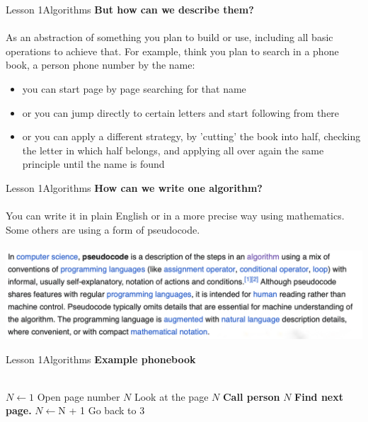 \documentclass[aspectratio=1610]{beamer}
\begin{document}
\begin{frame}{Lesson 1}{Algorithms}
\Large
\textbf{But how can we describe them?}\\~\\ 
As an abstraction of something you plan to build or use, including all basic operations to achieve that. For example, think you plan to search in a phone book, a person phone number by the name:
\begin{itemize}
    \item you can start page by page searching for that name
    \item or you can jump directly to certain letters and start following from there
    \item or you can apply a different strategy, by 'cutting' the book into half, checking the letter in which half belongs, and applying all over again the same principle until the name is found
\end{itemize}
\end{frame}


\begin{frame}{Lesson 1}{Algorithms}
\Large
\textbf{How can we write one algorithm?}\\~\\ 
You can write it in plain English or in a more precise way using mathematics. Some others are using a form of \alert{pseudocode}.\\~\\
\includegraphics[scale=0.27]{Images/pseudocode}

\end{frame}



\begin{frame}{Lesson 1}{Algorithms}
\Large
\textbf{Example phonebook}\\~\\

\label{phonebook}

\begin{algorithmic}[1]

\State $N\gets 1$
\State Open page number $N$
\State Look at the page $N$
    \State \textbf{Call person} $N$
\Else \State \textbf{Find next page.} {$N\gets $N + 1} Go back to 3 
\EndIf
\EndProcedure
\end{algorithmic}
\end{frame}
\end{document}
